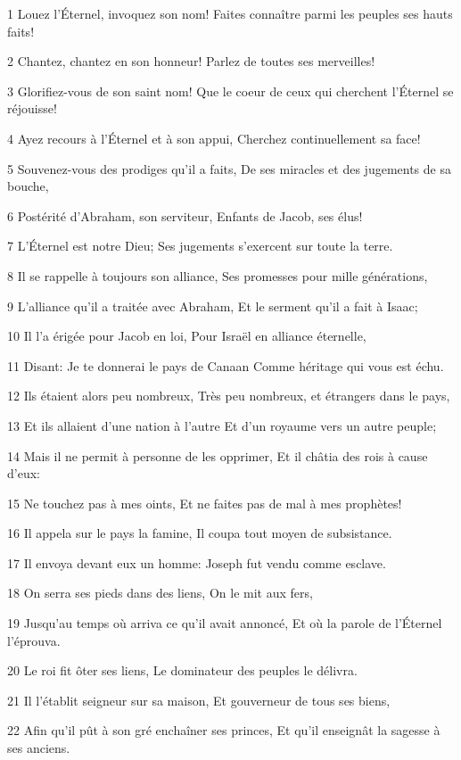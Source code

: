\par 1 Louez l'Éternel, invoquez son nom! Faites connaître parmi les peuples ses hauts faits!
\par 2 Chantez, chantez en son honneur! Parlez de toutes ses merveilles!
\par 3 Glorifiez-vous de son saint nom! Que le coeur de ceux qui cherchent l'Éternel se réjouisse!
\par 4 Ayez recours à l'Éternel et à son appui, Cherchez continuellement sa face!
\par 5 Souvenez-vous des prodiges qu'il a faits, De ses miracles et des jugements de sa bouche,
\par 6 Postérité d'Abraham, son serviteur, Enfants de Jacob, ses élus!
\par 7 L'Éternel est notre Dieu; Ses jugements s'exercent sur toute la terre.
\par 8 Il se rappelle à toujours son alliance, Ses promesses pour mille générations,
\par 9 L'alliance qu'il a traitée avec Abraham, Et le serment qu'il a fait à Isaac;
\par 10 Il l'a érigée pour Jacob en loi, Pour Israël en alliance éternelle,
\par 11 Disant: Je te donnerai le pays de Canaan Comme héritage qui vous est échu.
\par 12 Ils étaient alors peu nombreux, Très peu nombreux, et étrangers dans le pays,
\par 13 Et ils allaient d'une nation à l'autre Et d'un royaume vers un autre peuple;
\par 14 Mais il ne permit à personne de les opprimer, Et il châtia des rois à cause d'eux:
\par 15 Ne touchez pas à mes oints, Et ne faites pas de mal à mes prophètes!
\par 16 Il appela sur le pays la famine, Il coupa tout moyen de subsistance.
\par 17 Il envoya devant eux un homme: Joseph fut vendu comme esclave.
\par 18 On serra ses pieds dans des liens, On le mit aux fers,
\par 19 Jusqu'au temps où arriva ce qu'il avait annoncé, Et où la parole de l'Éternel l'éprouva.
\par 20 Le roi fit ôter ses liens, Le dominateur des peuples le délivra.
\par 21 Il l'établit seigneur sur sa maison, Et gouverneur de tous ses biens,
\par 22 Afin qu'il pût à son gré enchaîner ses princes, Et qu'il enseignât la sagesse à ses anciens.
